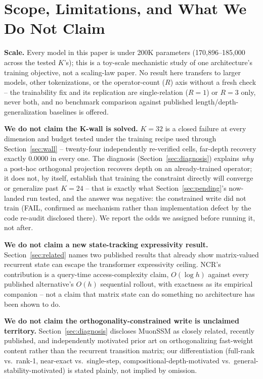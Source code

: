 \section{Scope, Limitations, and What We Do Not Claim}
\label{sec:discussion}

\textbf{Scale.} Every model in this paper is under 200K parameters
(170,896--185,000 across the tested $K$'s); this is a toy-scale
mechanistic study of one architecture's training objective, not a
scaling-law paper. No result here transfers to larger models, other
tokenizations, or the operator-count ($R$) axis without a fresh check --
the trainability fix and its replication are single-relation ($R{=}1$)
or $R{=}3$ only, never both, and no benchmark comparison against
published length/depth-generalization baselines is offered.

\textbf{We do not claim the K-wall is solved.} $K{=}32$ is a closed
failure at every dimension and budget tested under the training recipe
used through Section~\ref{sec:wall} -- twenty-four independently
re-verified cells, far-depth recovery exactly $0.0000$ in every one.
The diagnosis (Section~\ref{sec:diagnosis}) explains \emph{why} a
post-hoc orthogonal projection recovers depth on an already-trained
operator; it does not, by itself, establish that training the constraint
directly will converge or generalize past $K{=}24$ -- that is exactly
what Section~\ref{sec:pending}'s now-landed run tested, and the answer
was negative: the constrained write did not train (FAIL, confirmed as
mechanism rather than implementation defect by the code re-audit
disclosed there). We report the odds we assigned before running it, not
after.

\textbf{We do not claim a new state-tracking expressivity result.}
Section~\ref{sec:related} names two published results
\citep{grazzi2025unlocking,peng2025rwkv7} that already show matrix-valued
recurrent state can escape the transformer expressivity ceiling. NCR's
contribution is a query-time access-complexity claim, $O(\log h)$ against
every published alternative's $O(h)$ sequential rollout, with exactness
as its empirical companion -- not a claim that matrix state can do
something no architecture has been shown to do.

\textbf{We do not claim the orthogonality-constrained write is
unclaimed territory.} Section~\ref{sec:diagnosis} discloses MuonSSM
\citep{nguyen2026muonssm} as closely related, recently published, and
independently motivated prior art on orthogonalizing fast-weight content
rather than the recurrent transition matrix; our differentiation (full-rank
vs.\ rank-1, near-exact vs.\ single-step, compositional-depth-motivated vs.\
general-stability-motivated) is stated plainly, not implied by omission.

